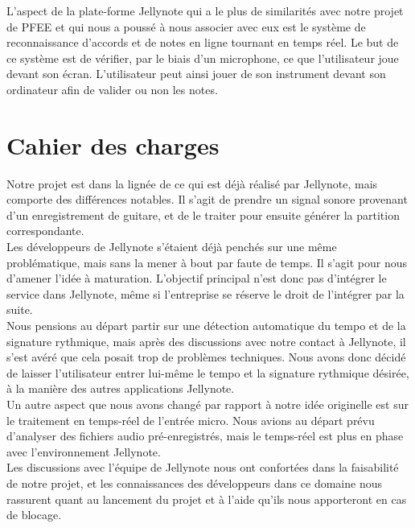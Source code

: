 \documentclass[12pt]{article}
\begin{document}
L'aspect de la plate-forme Jellynote qui a le plus de similarités avec notre projet de PFEE et qui nous a poussé à nous associer avec eux est le système de reconnaissance d’accords et de notes en ligne tournant en temps réel. Le but de ce système est de vérifier, par le biais d’un microphone, ce que l’utilisateur joue devant son écran. L'utilisateur peut ainsi jouer de son instrument devant son ordinateur afin de valider ou non les notes.

\newpage
\section{Cahier des charges}

Notre projet est dans la lignée de ce qui est déjà réalisé par Jellynote, mais comporte des différences notables. Il s’agit de prendre un signal sonore provenant d’un enregistrement de guitare, et de le traiter pour ensuite générer la partition correspondante.\\

Les développeurs de Jellynote s’étaient déjà penchés sur une même problématique, mais sans la mener à bout par faute de temps. Il s’agit pour nous d’amener l’idée à maturation. L’objectif principal n’est donc pas d’intégrer le service dans Jellynote, même si l’entreprise se réserve le droit de l’intégrer par la suite.\\


Nous pensions au départ partir sur une détection automatique du tempo et de la signature rythmique, mais après des discussions avec notre contact à Jellynote, il s'est avéré que cela posait trop de problèmes techniques. Nous avons donc décidé de laisser l'utilisateur entrer lui-même le tempo et la signature rythmique désirée, à la manière des autres applications Jellynote.\\

Un autre aspect que nous avons changé par rapport à notre idée originelle est sur le traitement en temps-réel de l'entrée micro. Nous avions au départ prévu d'analyser des fichiers audio pré-enregistrés, mais le temps-réel est plus en phase avec l'environnement Jellynote.\\

Les discussions avec l’équipe de Jellynote nous ont confortées dans la faisabilité de notre projet, et les connaissances des développeurs dans ce domaine nous rassurent quant au lancement du projet et à l’aide qu’ils nous apporteront en cas de blocage.\\
\end{document}
